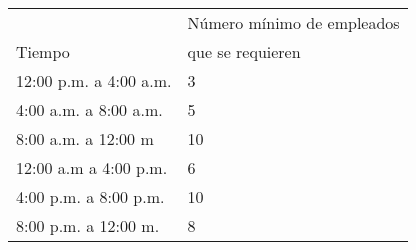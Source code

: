\begin{table}[H]
\centering
\begin{tabular}{ll}
\hline
                       & Número mínimo de empleados \\
Tiempo                 & que se requieren                                                                                                       \\
\hline
12:00 p.m. a 4:00 a.m. & 3                                                                                                      \\
4:00 a.m. a 8:00 a.m.  & 5                                                                                                      \\
8:00 a.m. a 12:00 m    & 10                                                                                                     \\
12:00 a.m a 4:00 p.m.  & 6                                                                                                      \\
4:00 p.m. a 8:00 p.m.  & 10                                                                                                     \\
8:00 p.m. a 12:00 m.   & 8                                                                                                      \\
\hline
\end{tabular}
\label{tabla:2}
\end{table}

